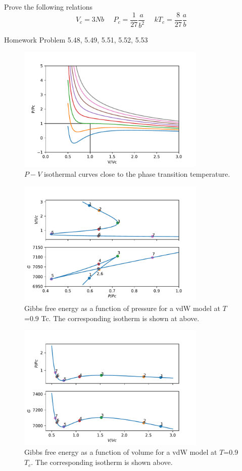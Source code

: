 Prove the following relations
\begin{equation}
V_c = 3Nb ~~~~~~  P_c = \frac{1}{27} \frac{a}{b^2} ~~~~~~ kT_c = \frac{8}{27} \frac{a}{b}
\end{equation}

Homework 
Problem 5.48, 5.49, 5.51, 5.52, 5.53


\begin{figure}[h]
\centering
\includegraphics[width=9cm]{imgs/vdW.pdf}
\caption{$P-V$ isothermal curves close to the phase transition temperature. }
\end{figure}


\begin{figure}[h]
\centering
\includegraphics[width=9cm]{imgs/MaxWell.pdf}
\caption{Gibbs free energy as a function of pressure for a vdW model at $T$=0.9 Tc. The corresponding isotherm is shown at above.}
\end{figure}

\begin{figure}[h]
\centering
\includegraphics[width=9cm]{imgs/MaxWell-f.pdf}
\caption{Gibbs free energy as a function of volume for a vdW model at $T$=0.9 $T_c$. The corresponding isotherm is shown above.}
\end{figure}


